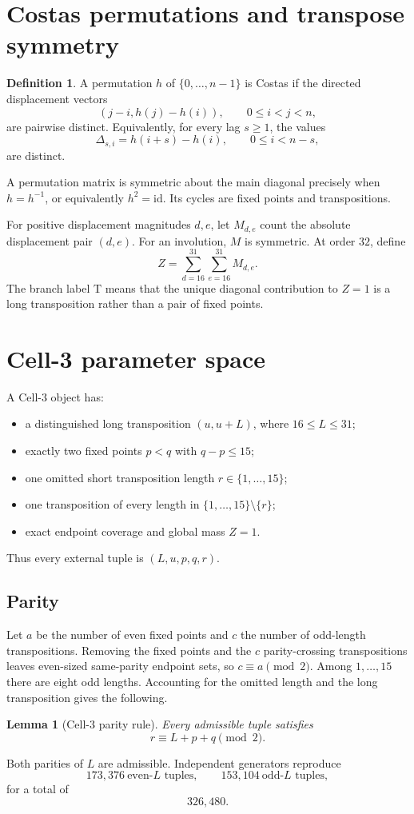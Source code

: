 \documentclass[11pt,a4paper]{article}
\newtheorem{lemma}[theorem]{Lemma}
\theoremstyle{definition}\newtheorem{definition}[theorem]{Definition}
\theoremstyle{remark}\newtheorem{remark}[theorem]{Remark}
\begin{document}
\section{Costas permutations and transpose symmetry}
\begin{definition}
A permutation $h$ of $\{0,\ldots,n-1\}$ is Costas if the directed displacement vectors
\[
(j-i,h(j)-h(i)),\qquad 0\le i<j<n,
\]
are pairwise distinct. Equivalently, for every lag $s\ge1$, the values
\[
\Delta_{s,i}=h(i+s)-h(i),\qquad 0\le i<n-s,
\]
are distinct.
\end{definition}
A permutation matrix is symmetric about the main diagonal precisely when $h=h^{-1}$, or equivalently $h^2=\mathrm{id}$. Its cycles are fixed points and transpositions.

For positive displacement magnitudes $d,e$, let $M_{d,e}$ count the absolute displacement pair $(d,e)$. For an involution, $M$ is symmetric. At order $32$, define
\[
Z=\sum_{d=16}^{31}\sum_{e=16}^{31}M_{d,e}.
\]
The branch label $\mathrm T$ means that the unique diagonal contribution to $Z=1$ is a long transposition rather than a pair of fixed points.

\section{Cell-3 parameter space}
A Cell-3 object has:
\begin{itemize}
\item a distinguished long transposition $(u,u+L)$, where $16\le L\le31$;
\item exactly two fixed points $p<q$ with $q-p\le15$;
\item one omitted short transposition length $r\in\{1,\ldots,15\}$;
\item one transposition of every length in $\{1,\ldots,15\}\setminus\{r\}$;
\item exact endpoint coverage and global mass $Z=1$.
\end{itemize}
Thus every external tuple is $(L,u,p,q,r)$.

\subsection{Parity}
Let $a$ be the number of even fixed points and $c$ the number of odd-length transpositions. Removing the fixed points and the $c$ parity-crossing transpositions leaves even-sized same-parity endpoint sets, so $c\equiv a\pmod2$. Among $1,\ldots,15$ there are eight odd lengths. Accounting for the omitted length and the long transposition gives the following.
\begin{lemma}[Cell-3 parity rule]
Every admissible tuple satisfies
\[
\boxed{r\equiv L+p+q\pmod2.}
\]
\end{lemma}
Both parities of $L$ are admissible. Independent generators reproduce
\[
173{,}376\ \text{even-}L\text{ tuples},\qquad153{,}104\ \text{odd-}L\text{ tuples},
\]
for a total of
\[
\boxed{326{,}480.}
\]
\end{document}

